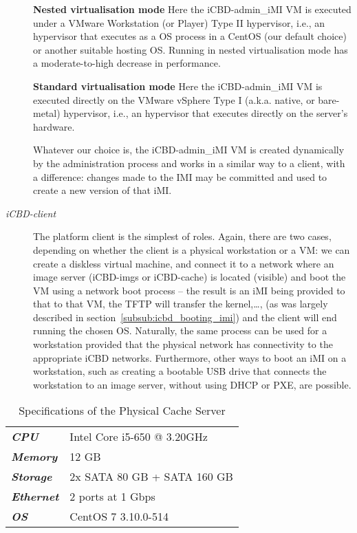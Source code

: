 \begin{description}
	\textbf{Nested virtualisation mode}  Here the iCBD-admin\_iMI VM is executed under a VMware Workstation (or Player) Type II hypervisor, i.e., an hypervisor that executes as a OS process in a CentOS (our default choice) or another suitable hosting OS. Running in nested virtualisation mode has a moderate-to-high decrease in performance.
	 
	\textbf{Standard virtualisation mode}  Here the iCBD-admin\_iMI VM is executed directly on the VMware vSphere Type I (a.k.a. native, or bare-metal) hypervisor, i.e., an hypervisor that executes directly on the server’s hardware.
	
	Whatever our choice is, the iCBD-admin\_iMI VM is created dynamically by the administration process and works in a similar way to a client, with a difference: changes made to the IMI may be committed and used to create a new version of that iMI.
	\item [\textit{iCBD-client}] The platform client is the simplest of roles. Again, there are two cases, depending on whether the client is a physical workstation or a VM: we can create a diskless virtual machine, and connect it to a network where an image server (iCBD-imgs or iCBD-cache) is located (visible) and boot the VM using a network boot process – the result is an iMI being provided to that to that VM, the TFTP will transfer the kernel,…, (as was largely described in section~\ref{subsub:icbd_booting_imi}) and the client will end running the chosen OS. Naturally, the same process can be used for a workstation provided that the physical network has connectivity to the appropriate iCBD networks. Furthermore, other ways to boot an iMI on a workstation, such as creating a bootable USB drive that connects the workstation to an image server, without using DHCP or PXE, are possible.
\end{description}

\begin{table}[htpb]
\centering
\begin{tabular}{ll}
\textit{\textbf{CPU}} 		& Intel Core i5-650 @ 3.20GHz \\
\textit{\textbf{Memory}} 	& 12 GB \\
\textit{\textbf{Storage}} 	& 2x SATA 80 GB  + SATA 160 GB \\
\textit{\textbf{Ethernet}} 	& 2 ports at 1 Gbps \\
\textit{\textbf{OS}} 		& CentOS 7 3.10.0-514
\end{tabular}
\caption{Specifications of the Physical Cache Server}
\label{tab:imple_cs}
\end{table}




